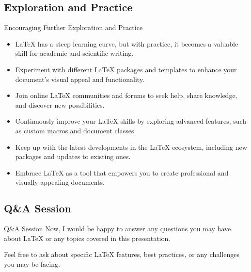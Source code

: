 \documentclass[aspectratio=169]{SUSTechBeamer}
\begin{document}
\subsection{Exploration and Practice}
\begin{frame}{Encouraging Further Exploration and Practice}
\begin{itemize}
    \item LaTeX has a steep learning curve, but with practice, it becomes a valuable skill for academic and scientific writing.
    \item Experiment with different LaTeX packages and templates to enhance your document's visual appeal and functionality.
    \item Join online LaTeX communities and forums to seek help, share knowledge, and discover new possibilities.
    \item Continuously improve your LaTeX skills by exploring advanced features, such as custom macros and document classes.
    \item Keep up with the latest developments in the LaTeX ecosystem, including new packages and updates to existing ones.
    \item Embrace LaTeX as a tool that empowers you to create professional and visually appealing documents.
\end{itemize}
\end{frame}

\subsection{Q\&A Session}
\begin{frame}{Q\&A Session}
    Now, I would be happy to answer any questions you may have about LaTeX or any topics covered in this presentation.

    Feel free to ask about specific LaTeX features, best practices, or any challenges you may be facing.
\end{frame}
\end{document}
